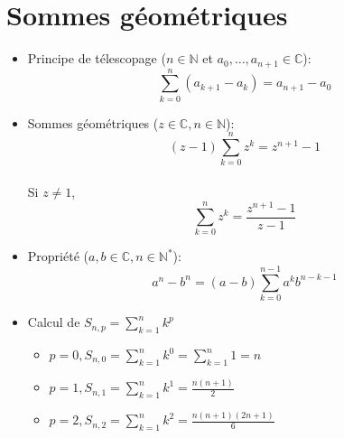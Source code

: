 \documentclass[fleqn]{article}
\begin{document}
\section{Sommes g\'eom\'etriques}
\begin{itemize}
	\item Principe de t\'elescopage (\(n \in \mathbb{N}\) et \(a_0, \hdots, a_{n+1} \in \mathbb{C}\)): \\
		\[\sum_{k=0}^{n} (a_{k+1} - a_k) = a_{n+1} - a_0\]
	\item Sommes g\'eom\'etriques (\(z \in \mathbb{C}, n \in \mathbb{N}\)):
		\[(z-1)\sum_{k=0}^{n}z^k = z^{n+1} -1\] \\
		Si \(z \neq 1\), \\
		\[\sum_{k=0}^{n}z^k=\frac{z^{n+1}-1}{z-1}\]
	\item Propri\'{e}t\'{e} (\(a,b \in \mathbb{C}, n \in \mathbb{N}^*\)): \\
		\[a^n-b^n = (a-b)\sum_{k=0}^{n-1}a^kb^{n-k-1}\]
	\item Calcul de \(S_{n,p} = \sum_{k=1}^{n}k^p\) \\
		\begin{itemize}
			\item \(p = 0, S_{n,0} = \sum_{k=1}^{n}k^0 = \sum_{k=1}^{n}1 = n\)
			\item \(p = 1, S_{n,1} = \sum_{k=1}^{n}k^1 = \frac{n(n+1)}{2} \)
			\item \(p = 2, S_{n,2} = \sum_{k=1}^{n}k^2 = \frac{n(n+1)(2n+1)}{6} \)
		\end{itemize}
\end{itemize}
\end{document}
